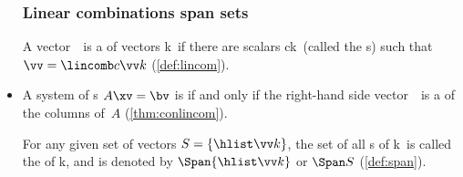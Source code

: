 \begin{itemize}
\subsubsection{Linear combinations span sets}

\itemhi A vector~\vv\ is a  of vectors \hlist\vv k\ if there are scalars \hlist ck\ (called the s) such that \(\vv=\lincomb c\vv k\) (\autoref{def:lincom}).

\item A system of s \(A\xv=\bv\) is  if and only if the right-hand side vector~\bv\ is a  of the columns of~\(A\) (\autoref{thm:conlincom}).

\itemhi For any given set of vectors \(S=\{\hlist\vv k\}\), the set of all s of \hlist\vv k\ is called the  of \hlist\vv k, and is denoted by \(\Span\{\hlist\vv k\}\) or \(\Span S\) (\autoref{def:span}).

\end{itemize}


\makeanswers
